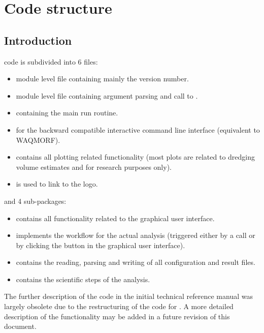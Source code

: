 \chapter{Code structure}

\section{Introduction}

\dfastmi code is subdivided into 6 files:

\begin{itemize}
\item {} module level file containing mainly the version number.
\item {} module level file containing argument parsing and call to .
\item {} containing the main run routine.
\item {} for the backward compatible interactive command line interface (equivalent to WAQMORF).
\item {} contains all plotting related functionality (most plots are related to dredging volume estimates and for research purposes only).
\item {} is used to link to the \dfastmi logo.
\end{itemize}

and 4 sub-packages:

\begin{itemize}
\item {} contains all functionality related to the graphical user interface.
\item {} implements the workflow for the actual \dfastmi analysis (triggered either by a  call or by clicking the  button in the graphical user interface).
\item {} contains the reading, parsing and writing of all configuration and result files.
\item {} contains the scientific steps of the analysis.
\end{itemize}

The further description of the code in the initial technical reference manual was largely obsolete due to the restructuring of the code for .
A more detailed description of the functionality may be added in a future revision of this document.